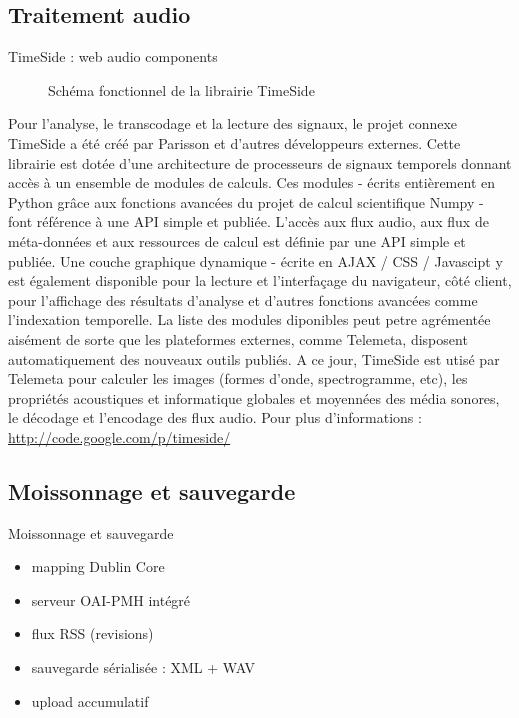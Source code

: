 \documentclass[a4paper,11pt,french]{article}
\begin{document}
\subsection{Traitement audio}

TimeSide : web audio components

\begin{figure}[htp]
    \centering
    \caption{Schéma fonctionnel de la librairie TimeSide}
    \label{index1}
\end{figure}


Pour l'analyse, le transcodage et la lecture des signaux, le projet connexe TimeSide a été créé par Parisson et d'autres développeurs externes. Cette librairie est dotée d'une architecture de processeurs de signaux temporels donnant accès à un ensemble de modules de calculs. Ces modules -  écrits entièrement en Python grâce aux fonctions avancées du projet de calcul scientifique Numpy - font référence à une API simple et publiée. L'accès aux flux audio, aux flux de méta-données et aux ressources de calcul est définie par une API simple et publiée. Une couche graphique dynamique - écrite en AJAX / CSS / Javascipt y est également disponible pour la lecture et l'interfaçage du navigateur, côté client, pour l'affichage des résultats d'analyse et d'autres fonctions avancées comme l'indexation temporelle. La liste des modules diponibles peut petre agrémentée aisément de sorte que les plateformes externes, comme Telemeta, disposent automatiquement des nouveaux outils publiés. A ce jour, TimeSide est utisé par Telemeta pour calculer les images (formes d'onde, spectrogramme, etc), les propriétés acoustiques et informatique globales et moyennées des média sonores, le décodage et l'encodage des flux audio. Pour plus d'informations : \href{http://code.google.com/p/timeside/}{http://code.google.com/p/timeside/} \\


\subsection{Moissonnage et sauvegarde}

Moissonnage et sauvegarde

\begin{itemize}
\item mapping Dublin Core
\item serveur OAI-PMH intégré
\item flux RSS (revisions)
\item sauvegarde sérialisée : XML + WAV
\item upload accumulatif
\end{itemize}
\end{document}

